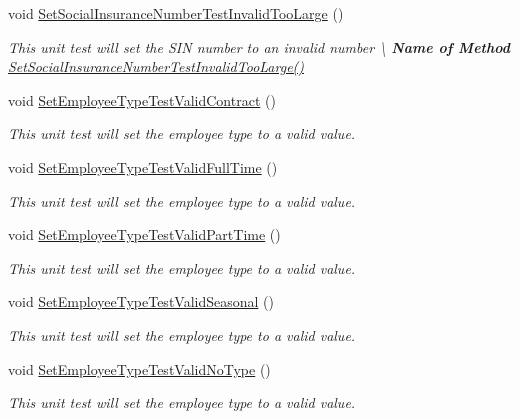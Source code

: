 \begin{DoxyCompactItemize}
void \hyperlink{class_my_all_employee_1_1_tests_1_1_employee_tests_a45dfe5f9e4be553bf514505e700221c3}{Set\+Social\+Insurance\+Number\+Test\+Invalid\+Too\+Large} ()
\begin{DoxyCompactList}\small\item\em This unit test will set the S\+I\+N number to an invalid number \textbackslash{} {\bfseries  Name of Method} \hyperlink{class_my_all_employee_1_1_tests_1_1_employee_tests_a45dfe5f9e4be553bf514505e700221c3}{Set\+Social\+Insurance\+Number\+Test\+Invalid\+Too\+Large()} \end{DoxyCompactList}\item 
void \hyperlink{class_my_all_employee_1_1_tests_1_1_employee_tests_adb92917123aa50123ed0198ebad41327}{Set\+Employee\+Type\+Test\+Valid\+Contract} ()
\begin{DoxyCompactList}\small\item\em This unit test will set the employee type to a valid value. \end{DoxyCompactList}\item 
void \hyperlink{class_my_all_employee_1_1_tests_1_1_employee_tests_a826c7c75c5ae1d95ab50b205a88a7553}{Set\+Employee\+Type\+Test\+Valid\+Full\+Time} ()
\begin{DoxyCompactList}\small\item\em This unit test will set the employee type to a valid value. \end{DoxyCompactList}\item 
void \hyperlink{class_my_all_employee_1_1_tests_1_1_employee_tests_a05c6b8130dc01a9a393ba0459bfb1662}{Set\+Employee\+Type\+Test\+Valid\+Part\+Time} ()
\begin{DoxyCompactList}\small\item\em This unit test will set the employee type to a valid value. \end{DoxyCompactList}\item 
void \hyperlink{class_my_all_employee_1_1_tests_1_1_employee_tests_a1c51363de67faf0cae1ace7a70afe294}{Set\+Employee\+Type\+Test\+Valid\+Seasonal} ()
\begin{DoxyCompactList}\small\item\em This unit test will set the employee type to a valid value. \end{DoxyCompactList}\item 
void \hyperlink{class_my_all_employee_1_1_tests_1_1_employee_tests_abd1fccba15048484dff6f4b08adbc2c6}{Set\+Employee\+Type\+Test\+Valid\+No\+Type} ()
\begin{DoxyCompactList}\small\item\em This unit test will set the employee type to a valid value. \end{DoxyCompactList}\item 

\end{DoxyCompactItemize}
